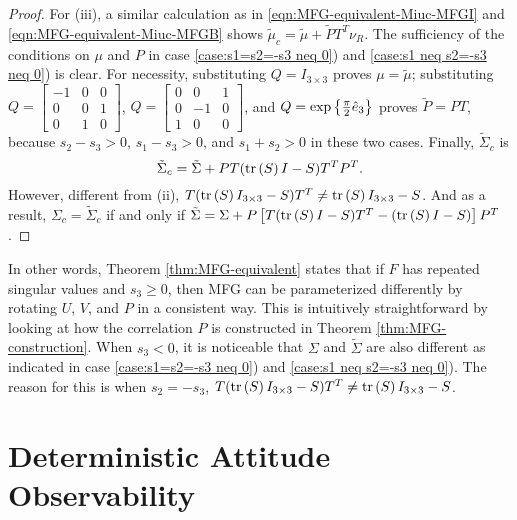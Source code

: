 \begin{proof}
	For (iii), a similar calculation as in \eqref{eqn:MFG-equivalent-Miuc-MFGI} and \eqref{eqn:MFG-equivalent-Miuc-MFGB} shows $\tilde{\mu}_c = \tilde{\mu} + \tilde{P}T^T \nu_R$.
	The sufficiency of the conditions on $\mu$ and $P$ in case \ref{case:s1=s2=-s3 neq 0}) and \ref{case:s1 neq s2=-s3 neq 0}) is clear.
	For necessity, substituting $Q=I_{3\times 3}$ proves $\mu=\tilde{\mu}$; substituting $Q=\begin{bmatrix} -1 & 0 & 0 \\ 0 & 0 & 1 \\ 0 & 1 & 0 \end{bmatrix}$, $Q=\begin{bmatrix} 0 & 0 & 1 \\ 0 & -1 & 0 \\ 1 & 0 & 0 \end{bmatrix}$, and $Q=\exp\left\{ \tfrac{\pi}{2}\hat{e}_3 \right\}$ proves $\tilde{P} = PT$, because $s_2-s_3>0$, $s_1-s_3>0$, and $s_1+s_2>0$ in these two cases.
	Finally, $\tilde{\Sigma}_c$ is
	\begin{equation}
		\tilde{\Sigma}_c = \tilde{\Sigma} + PT(\mathrm{tr}\left( S \right)I-S)T^TP^T.
	\end{equation}
	However, different from (ii), $T(\mathrm{tr}\left( S \right)I_{3 \times 3}-S)T^T \neq \mathrm{tr}\left( S \right)I_{3 \times 3}-S$.
	And as a result, $\Sigma_c = \tilde{\Sigma}_c$ if and only if $\tilde{\Sigma} = \Sigma + P\left[ T(\mathrm{tr}\left( S \right)I-S)T^T - (\mathrm{tr}\left( S \right)I-S) \right]P^T$.
\end{proof}

In other words, Theorem \ref{thm:MFG-equivalent} states that if $F$ has repeated singular values and $s_3\geq 0$, then MFG can be parameterized differently by rotating $U$, $V$, and $P$ in a consistent way.
This is intuitively straightforward by looking at how the correlation $P$ is constructed in Theorem \ref{thm:MFG-construction}.
When $s_3<0$, it is noticeable that $\Sigma$ and $\tilde{\Sigma}$ are also different as indicated in case \ref{case:s1=s2=-s3 neq 0}) and \ref{case:s1 neq s2=-s3 neq 0}).
The reason for this is when $s_2=-s_3$, $T(\mathrm{tr}\left( S \right)I_{3\times 3}-S)T^T \neq \mathrm{tr}\left( S \right)I_{3\times 3}-S$.

\chapter{Deterministic Attitude Observability} \label{app:obervability-deterministic}

